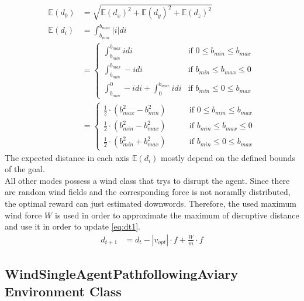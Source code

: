 \begin{align}
	\mathbb{E}(d_0) &= \sqrt{\mathbb{E}(d_x)^2 + \mathbb{E}(d_y)^2 + \mathbb{E}(d_z)^2} \\
	\mathbb{E}(d_i) &= \int_{b_{min}}^{b_{max}} |i| di \\
	&= 
	\left\{
	\begin{array}{ll}
		 \int_{b_{min}}^{b_{max}} i di & \mbox{if } 0 \leq b_{min} \leq b_{max} \\
		 \int_{b_{min}}^{b_{max}} -i di & \mbox{if } b_{min} \leq b_{max} \leq 0\\
		\int_{b_{min}}^{0} -i di + \int_{0}^{b_{max}} i di  & \mbox{if } b_{min} \leq 0 \leq b_{max}
	\end{array}
	\right. \\
	&=
	\left\{
	\begin{array}{ll}
		\frac{1}{2} \cdot (b_{max}^2 - b_{min}^2) \enspace \enspace \enspace \enspace  & \mbox{if } 0 \leq b_{min} \leq b_{max} \\
		\frac{1}{2} \cdot (b_{min}^2 - b_{max}^2)  & \mbox{if } b_{min} \leq b_{max} \leq 0\\
		\frac{1}{2} \cdot (b_{min}^2 + b_{max}^2) & \mbox{if } b_{min} \leq 0 \leq b_{max}
	\end{array}
	\right.
	\label{eq:expd}
\end{align}
The expected distance in each axis $\mathbb{E}(d_i)$ mostly depend on the defined bounds of the goal.\\
\newline
All other modes possess a wind class that trys to disrupt the agent. Since there are random wind fields and the corresponding force is not noramlly distributed, the optimal reward can just estimated downwords. Therefore, the used maximum wind force $W$ is used in order to approximate the maximum of disruptive distance and use it in order to update \cref{eq:dt1}.
\begin{align}
	d_{t+1} &= d_t - | v_{opt} | \cdot f + \frac{W}{m} \cdot f
\end{align}
\newpage

\subsection{WindSingleAgentPathfollowingAviary Environment Class}


